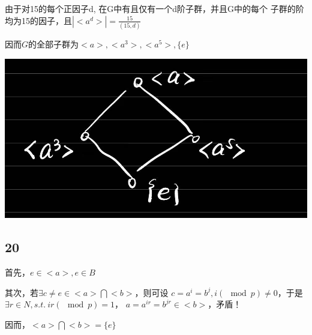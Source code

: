\documentclass[UTF8]{ctexart}
\begin{document}
由于对15的每个正因子d, 在G中有且仅有一个d阶子群，并且G中的每个
子群的阶均为15的因子，且$|<a^d>| = \frac{15}{(15, d)}$

因而$G$的全部子群为$<a>, <a^3>, <a^5>, \{e\}$

\includegraphics[width=.8\textwidth]{../pics/4.jpeg}

\subsection*{20}

首先，$e\in <a>, e\in B$

其次，若$\exists c\neq e\in <a>\bigcap <b>$，则可设
$c = a^i = b^j, i(\mod p)\neq 0$，于是$\exists r\in N, s.t.\ ir(\mod p) = 1$，
$a = a^{ir} = b^{jr}\in <b>$，矛盾！

因而，$<a>\bigcap <b> = \{e\}$
\end{document}
